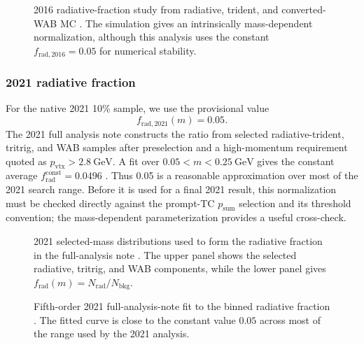 \begin{figure}[H]
\centering
{}
\caption{2016 radiative-fraction study from radiative, trident, and converted-WAB MC
\cite{HPS2016BumpInternal}. The simulation gives an intrinsically mass-dependent
normalization, although this analysis uses the constant
$f_{\mathrm{rad},2016}=0.05$ for numerical stability.}
\label{fig:2016-radfrac}
\end{figure}

\subsubsection{2021 radiative fraction}

For the native 2021 10\% sample, we use the provisional value
\begin{equation}
f_{\mathrm{rad},2021}(m) = 0.05.
\end{equation}
The 2021 full analysis note constructs the ratio from selected radiative-trident,
tritrig, and WAB samples after preselection and a high-momentum requirement quoted as
$p_{\mathrm{vtx}}>2.8~\mathrm{GeV}$. A fit over
$0.05<m<0.25~\mathrm{GeV}$ gives the constant average
$f_{\mathrm{rad}}^{\mathrm{const}}=0.0496$ \cite[Sec.~6.1, Figs.~92--93,
Eqs.~25--26]{HPS2021FullAnalysisNote}. Thus 0.05 is a reasonable approximation over
most of the 2021 search range. Before it is used for a final 2021 result, this
normalization must be checked directly against the prompt-TC $p_{\mathrm{sum}}$
selection and its threshold convention; the mass-dependent parameterization provides a
useful cross-check.

\begin{figure}[H]
\centering
{}
\caption{2021 selected-mass distributions used to form the radiative fraction in the
full-analysis note \cite{HPS2021FullAnalysisNote}. The upper panel shows the selected
radiative, tritrig, and WAB components, while the lower panel gives
$f_{\mathrm{rad}}(m)=N_{\mathrm{rad}}/N_{\mathrm{bkg}}$.}
\label{fig:2021-radfrac-note-components}
\end{figure}

\begin{figure}[H]
\centering
{}
\caption{Fifth-order 2021 full-analysis-note fit to the binned radiative fraction
\cite{HPS2021FullAnalysisNote}. The fitted curve is close to the constant value
$0.05$ across most of the range used by the 2021 analysis.}
\label{fig:2021-radfrac-note-fit}
\end{figure}

